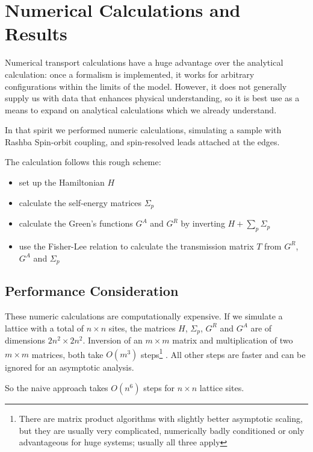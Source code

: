 \chapter{Numerical Calculations and Results}
\label{sec:numerics}

Numerical transport calculations have a huge advantage over the analytical
calculation: once a formalism is implemented, it works for arbitrary
configurations within the limits of the model. However, it does not generally
supply us with data that enhances physical understanding, so it is best use as a
means to expand on analytical calculations which we already understand.

In that spirit we performed numeric calculations, simulating a sample with
Rashba Spin-orbit coupling, and spin-resolved leads attached at the edges.

The calculation follows this rough scheme:

\begin{itemize}
    \item set up the Hamiltonian $H$
    \item calculate the self-energy matrices $\Sigma_p$
    \item calculate the Green's functions $G^A$ and $G^R$ by inverting
          $H + \sum_p \Sigma_p$
    \item use the Fisher-Lee relation to calculate the transmission matrix $T$
            from $G^R$, $G^A$ and $\Sigma_p$
\end{itemize}

\section{Performance Consideration}

These numeric calculations are computationally expensive. If we simulate a
lattice with a total of $n \times n$ sites, the matrices $H$, $\Sigma_p$, $G^R$ and
$G^A$ are of dimensions $2n^2 \times 2n^2$. Inversion of an $m \times m $
matrix and multiplication of two $ m \times m $ matrices, both take $O(m^3)$
steps\footnote{There are matrix product algorithms with slightly better
asymptotic scaling, but they are usually very complicated, numerically badly
conditioned or only advantageous for huge systems; usually all three apply}
\cite{matrixperformance}. All other steps are faster and can be ignored for
an asymptotic analysis.

So the naive approach takes $O(n^6)$ steps for $n \times n$ lattice sites.

